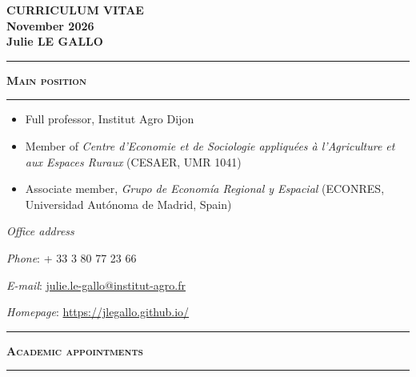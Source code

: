 \documentclass[a4paper,12pt]{article}
\newcommand{\titre}[1]{%
	\bigskip
	\noindent \rule[2mm]{\textwidth}{0.5pt}
	\textbf{\textsc{\large #1}} \\
	\noindent \rule[1mm]{\textwidth}{0.5pt}
	}
\begin{document}

\begin{center}
	\textbf{{\Large CURRICULUM VITAE}} \smallskip
	\\ \textbf{{\large November 2026}} 	\bigskip \bigskip
	\\ \textbf{{\Large Julie LE GALLO}}
\end{center}

\bigskip


\titre{Main position}

\begin{itemize}
	\item Full professor, Institut Agro Dijon
	\item Member of \textit{Centre d'Economie et de Sociologie appliquées à l'Agriculture et aux Espaces Ruraux} (CESAER, UMR 1041)
	\item Associate member, \textit{Grupo de Economía Regional y Espacial} (ECONRES, Universidad Autónoma de Madrid, Spain)
\end{itemize}

\smallskip
 
\textit{Office address}
\par {}
\par {}
\par {}
\par {} \smallskip
\par \textit{Phone}: + 33 3 80 77 23 66
\par \textit{E-mail}: \url{julie.le-gallo@institut-agro.fr} 
\par \textit{Homepage}: \url{https://jlegallo.github.io/}

\bigskip


\titre{Academic appointments}


\newlength{\annee}
\settowidth{\annee}{2003 - 2006}


\newlength{\texte}
\setlength{\texte}{\textwidth} \addtolength{\texte}{-\annee} 
	\addtolength{\texte}{-1\tabcolsep}
\end{document}
